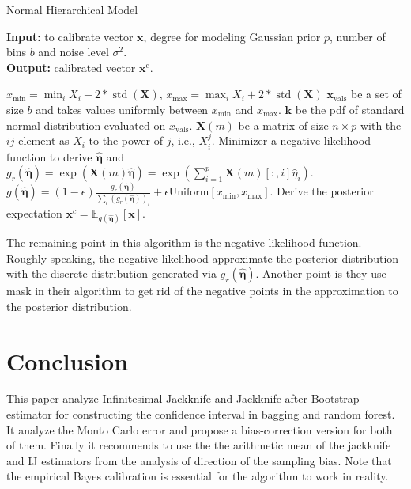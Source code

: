 \documentclass[11pt]{article}
\begin{document}
\begin{algorithm}
\caption{Normal Hierarchical Model}
\label{alg:Normal-Hierarchical}
\hspace*{\algorithmicindent} \textbf{Input:} to calibrate vector $\boldsymbol{x}$, degree for modeling Gaussian prior $p$, number of bins $b$ and noise level $\sigma^2$. \\
\hspace*{\algorithmicindent} \textbf{Output:} calibrated vector $\boldsymbol{x}^{\operatorname{c}}$. 
\begin{algorithmic}
	\State $x_\mathrm{min} = \min_i X_i - 2*\operatorname{std}(\boldsymbol{X})$, $x_\mathrm{max} = \max_i X_i + 2*\operatorname{std}(\boldsymbol{X})$
	\State $\boldsymbol{x}_{\mathrm{vals}}$ be a set of size $b$ and takes values uniformly between $x_\mathrm{min}$ and $x_\mathrm{max}$.
	\State $\boldsymbol{k}$ be the pdf of standard normal distribution evaluated on $x_{\mathrm{vals}}$.
	\State $\boldsymbol{X}(m)$ be a matrix of size $n\times p$ with the $ij$-element as $X_{i}$ to the power of $j$, i.e., $X_{i}^j$.
	\State Minimizer a negative likelihood function to derive $\hat{\boldsymbol{\eta}}$ and $g_{r}(\hat{\boldsymbol{\eta}}) = \exp(\boldsymbol{X}(m)\hat{\boldsymbol{\eta}}) = \exp(\sum_{i=1}^p \boldsymbol{X}(m)[:, i]\hat{\eta}_i)$.
	\State $g(\hat{\boldsymbol{\eta}}) = (1-\epsilon) \frac{g_{r}(\hat{\boldsymbol{\eta}})}{\sum_{i} (g_{r}(\hat{\boldsymbol{\eta}}))_{i}} + \epsilon \textrm{Uniform}[x_\mathrm{min}, x_\mathrm{max}]$.
	\State Derive the posterior expectation $\boldsymbol{x}^c = \mathbb{E}_{g(\hat{\boldsymbol{\eta}})}[\boldsymbol{x}]$.
\end{algorithmic}
\end{algorithm}

The remaining point in this algorithm is the negative likelihood function. 
Roughly speaking, the negative likelihood approximate the posterior distribution with the discrete distribution generated via $g_{r}(\hat{\boldsymbol{\eta}})$.
Another point is they use mask in their algorithm to get rid  of the negative points in the approximation to the posterior distribution.
	
\section{Conclusion}
This paper analyze Infinitesimal Jackknife and Jackknife-after-Bootstrap estimator for constructing the confidence interval in bagging and random forest.
It analyze the Monto Carlo error and propose a bias-correction version for both of them. 
Finally it recommends to use the the arithmetic mean of the jackknife and IJ estimators from the analysis of direction of the sampling bias.
Note that the empirical Bayes calibration is essential for the algorithm to work in reality.
\end{document}
